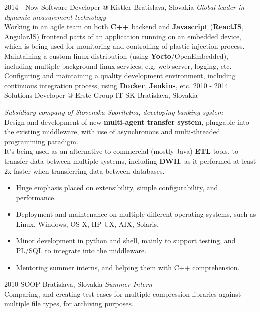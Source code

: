\documentclass[]{friggeri-cv} %
\begin{document}
\begin{entrylist}
\entry
{2014 - Now}
{Software Developer @ Kistler}
{Bratislava, Slovakia}
{\emph{Global leader in dynamic measurement technology} \\
Working in an agile team on both \textbf{C++} backend and \textbf{Javascript} (\textbf{ReactJS}, AngularJS) frontend parts of an application running on an embedded device, which is being used for monitoring and controlling of plastic injection process.
\\
Maintaining a custom linux distribution (using \textbf{Yocto}/OpenEmbedded), including multiple background linux services, e.g. web server, logging, etc.
\\
Configuring and maintaining a quality development environment, including continuous integration process, using \textbf{Docker}, \textbf{Jenkins}, etc.
}
\entry
{2010 - 2014}
{Solutions Developer @ Erste Group IT SK}
{Bratislava, Slovakia}
{\emph{Subsidiary company of Slovenska Sporitelna, developing banking system} \\
Design and development of new \textbf{multi-agent transfer system}, pluggable into the existing middleware, with use of asynchronous and multi-threaded programming paradigm.
\\
It's being used as an alternative to commercial (mostly Java) \textbf{ETL} tools, to transfer data between multiple systems, including \textbf{DWH}, as it performed at least 2x faster when transferring data between databases.

\begin{itemize}
\item Huge emphasis placed on extensibility, simple configurability, and performance. 
\item Deployment and maintenance on multiple different operating systems, such as Linux, Windows, OS X, HP-UX, AIX, Solaris.
\item Minor development in python and shell, mainly to support testing, and PL/SQL to integrate into the middleware.
\item Mentoring summer interns, and helping them with C++ comprehension.
\end{itemize}}

\entry
{2010}
{SOOP}
{Bratislava, Slovakia}
{\emph{Summer Intern} \\
Comparing, and creating test cases for multiple compression libraries against multiple file types, for archiving purposes.}
\end{entrylist}
\end{document}
